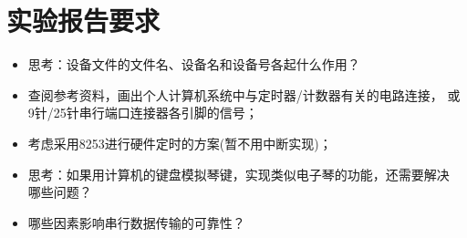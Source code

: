 \section{实验报告要求}
\begin{itemize}\itemsep=-3pt
  \item 思考：设备文件的文件名、设备名和设备号各起什么作用？
  \item 查阅参考资料，画出个人计算机系统中与定时器/计数器有关的电路连接，
		或9针/25针串行端口连接器各引脚的信号；
  \item 考虑采用8253进行硬件定时的方案(暂不用中断实现)；
  \item 思考：如果用计算机的键盘模拟琴键，实现类似电子琴的功能，还需要解决
		哪些问题？
  \item 哪些因素影响串行数据传输的可靠性？
\end{itemize}

